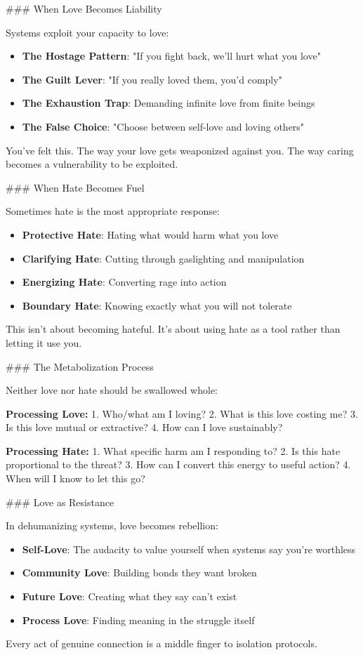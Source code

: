 \documentclass[12pt]{book}
\begin{document}
\#\#\# When Love Becomes Liability

Systems exploit your capacity to love:

\begin{itemize}
\item \textbf{The Hostage Pattern}: "If you fight back, we'll hurt what you love"
\item \textbf{The Guilt Lever}: "If you really loved them, you'd comply"
\item \textbf{The Exhaustion Trap}: Demanding infinite love from finite beings
\item \textbf{The False Choice}: "Choose between self-love and loving others"

\end{itemize}
You've felt this. The way your love gets weaponized against you. The way caring becomes a vulnerability to be exploited.

\#\#\# When Hate Becomes Fuel

Sometimes hate is the most appropriate response:

\begin{itemize}
\item \textbf{Protective Hate}: Hating what would harm what you love
\item \textbf{Clarifying Hate}: Cutting through gaslighting and manipulation
\item \textbf{Energizing Hate}: Converting rage into action
\item \textbf{Boundary Hate}: Knowing exactly what you will not tolerate

\end{itemize}
This isn't about becoming hateful. It's about using hate as a tool rather than letting it use you.

\#\#\# The Metabolization Process

Neither love nor hate should be swallowed whole:

\textbf{Processing Love:}
1. Who/what am I loving?
2. What is this love costing me?
3. Is this love mutual or extractive?
4. How can I love sustainably?

\textbf{Processing Hate:}
1. What specific harm am I responding to?
2. Is this hate proportional to the threat?
3. How can I convert this energy to useful action?
4. When will I know to let this go?

\#\#\# Love as Resistance

In dehumanizing systems, love becomes rebellion:

\begin{itemize}
\item \textbf{Self-Love}: The audacity to value yourself when systems say you're worthless
\item \textbf{Community Love}: Building bonds they want broken
\item \textbf{Future Love}: Creating what they say can't exist
\item \textbf{Process Love}: Finding meaning in the struggle itself

\end{itemize}
Every act of genuine connection is a middle finger to isolation protocols.
\end{document}
